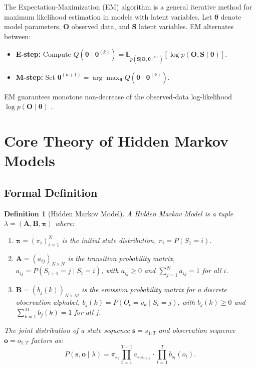 \documentclass[conference]{IEEEtran}
\newtheorem{definition}{Definition}
\begin{document}
The Expectation-Maximization (EM) algorithm \cite{dempster1977maximum} is a general iterative method for maximum likelihood estimation in models with latent variables. Let $\boldsymbol{\theta}$ denote model parameters, $\mathbf{O}$ observed data, and $\mathbf{S}$ latent variables. EM alternates between:
\begin{itemize}
  \item \textbf{E-step:} Compute $Q(\boldsymbol{\theta} \mid \boldsymbol{\theta}^{(k)}) = \mathbb{E}_{p(\mathbf{S}|\mathbf{O},\boldsymbol{\theta}^{(k)})}[\log p(\mathbf{O}, \mathbf{S} \mid \boldsymbol{\theta})]$.
  \item \textbf{M-step:} Set $\boldsymbol{\theta}^{(k+1)} = \arg\max_{\boldsymbol{\theta}} Q(\boldsymbol{\theta} \mid \boldsymbol{\theta}^{(k)})$.
\end{itemize}
EM guarantees monotone non-decrease of the observed-data log-likelihood $\log p(\mathbf{O} \mid \boldsymbol{\theta})$ \cite{dempster1977maximum}.

\section{Core Theory of Hidden Markov Models}
\label{sec:theory}

\subsection{Formal Definition}

\begin{definition}[Hidden Markov Model]
A \emph{Hidden Markov Model} is a tuple $\lambda = (\mathbf{A}, \mathbf{B}, \boldsymbol{\pi})$ where:
\begin{enumerate}
  \item $\boldsymbol{\pi} = (\pi_i)_{i=1}^{N}$ is the initial state distribution, $\pi_i = P(S_1 = i)$.
  \item $\mathbf{A} = (a_{ij})_{N \times N}$ is the transition probability matrix, $a_{ij} = P(S_{t+1} = j \mid S_t = i)$, with $a_{ij} \geq 0$ and $\sum_{j=1}^{N} a_{ij} = 1$ for all $i$.
  \item $\mathbf{B} = (b_j(k))_{N \times M}$ is the emission probability matrix for a discrete observation alphabet, $b_j(k) = P(O_t = v_k \mid S_t = j)$, with $b_j(k) \geq 0$ and $\sum_{k=1}^{M} b_j(k) = 1$ for all $j$.
\end{enumerate}
The joint distribution of a state sequence $\mathbf{s} = s_{1:T}$ and observation sequence $\mathbf{o} = o_{1:T}$ factors as:
\begin{equation}
P(\mathbf{s}, \mathbf{o} \mid \lambda) = \pi_{s_1} \prod_{t=1}^{T-1} a_{s_t s_{t+1}} \cdot \prod_{t=1}^{T} b_{s_t}(o_t).
\label{eq:joint}
\end{equation}
\end{definition}
\end{document}
